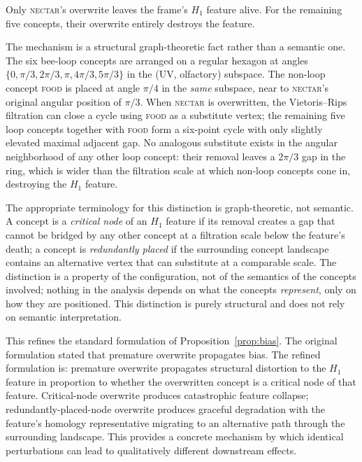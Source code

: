 \documentclass[12pt]{article}
\begin{document}
Only \textsc{nectar}'s overwrite leaves the frame's $H_1$ feature
alive. For the remaining five concepts, their overwrite entirely
destroys the feature.

The mechanism is a structural graph-theoretic fact rather than a
semantic one. The six bee-loop concepts are arranged on a regular
hexagon at angles $\{0, \pi/3, 2\pi/3, \pi, 4\pi/3, 5\pi/3\}$ in the
(UV, olfactory) subspace. The non-loop concept \textsc{food} is
placed at angle $\pi/4$ in the \emph{same} subspace, near to
\textsc{nectar}'s original angular position of $\pi/3$. When
\textsc{nectar} is overwritten, the Vietoris--Rips filtration can
close a cycle using \textsc{food} as a substitute vertex; the
remaining five loop concepts together with \textsc{food} form a
six-point cycle with only slightly elevated maximal adjacent gap.
No analogous substitute exists in the angular neighborhood of any
other loop concept: their removal leaves a $2\pi/3$ gap in the
ring, which is wider than the filtration scale at which non-loop
concepts cone in, destroying the $H_1$ feature.

The appropriate terminology for this distinction is graph-theoretic,
not semantic. A concept is a \emph{critical node} of an $H_1$
feature if its removal creates a gap that cannot be bridged by any
other concept at a filtration scale below the feature's death;
a concept is \emph{redundantly placed} if the surrounding concept
landscape contains an alternative vertex that can substitute at
a comparable scale. The distinction is a property of the
configuration, not of the semantics of the concepts involved;
nothing in the analysis depends on what the concepts
\emph{represent}, only on how they are positioned.
This distinction is purely structural and does not rely on semantic
interpretation.

This refines the standard formulation of Proposition~\ref{prop:bias}.
The original formulation stated that premature overwrite propagates
bias. The refined formulation is: premature overwrite propagates
structural distortion to the $H_1$ feature in proportion to whether
the overwritten concept is a critical node of that feature.
Critical-node overwrite produces catastrophic feature collapse;
redundantly-placed-node overwrite produces graceful degradation
with the feature's homology representative migrating to an alternative
path through the surrounding landscape.
This provides a concrete mechanism by which identical perturbations
can lead to qualitatively different downstream effects.
\end{document}
